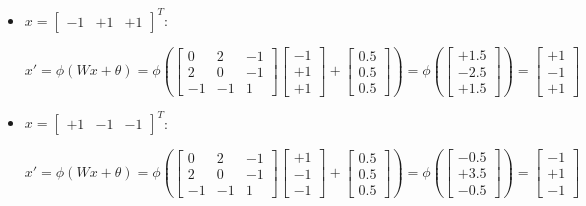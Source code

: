 \documentclass[letterpaper,headings=standardclasses]{scrartcl}
\begin{document}
\begin{itemize}
    \item $x = [\begin{matrix} -1 & +1 & +1 \end{matrix}]^T$:
    
    $$ x' = \phi(Wx + \theta) = \phi \left( \left[ \begin{matrix} 0 & 2 & -1 \\ 2 & 0 & -1 \\ -1 & -1 & 1 \end{matrix} \right] \left[ \begin{matrix} -1 \\ +1 \\ +1 \end{matrix} \right] + \left[ \begin{matrix} 0.5 \\ 0.5 \\ 0.5 \end{matrix} \right] \right) = \phi \left( \left[ \begin{matrix} +1.5 \\ -2.5 \\ +1.5 \end{matrix} \right] \right) = \left[ \begin{matrix} +1 \\ -1 \\ +1 \end{matrix} \right] $$

    \item $x = [\begin{matrix} +1 & -1 & -1 \end{matrix}]^T$:
    
    $$ x' = \phi(Wx + \theta) = \phi \left( \left[ \begin{matrix} 0 & 2 & -1 \\ 2 & 0 & -1 \\ -1 & -1 & 1 \end{matrix} \right] \left[ \begin{matrix} +1 \\ -1 \\ -1 \end{matrix} \right] + \left[ \begin{matrix} 0.5 \\ 0.5 \\ 0.5 \end{matrix} \right] \right) = \phi \left( \left[ \begin{matrix} -0.5 \\ +3.5 \\ -0.5 \end{matrix} \right] \right) = \left[ \begin{matrix} -1 \\ +1 \\ -1 \end{matrix} \right] $$


\end{itemize}
\end{document}
